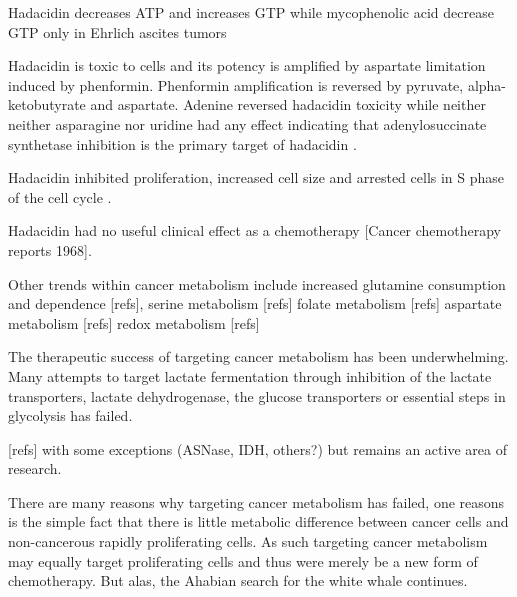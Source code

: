 Hadacidin decreases ATP and increases GTP while mycophenolic acid decrease GTP only in Ehrlich ascites tumors \cite{Barankiewicz2011-ak}

Hadacidin is toxic to cells and its potency is amplified by aspartate limitation induced by phenformin.
Phenformin amplification is reversed by pyruvate, alpha-ketobutyrate and aspartate.
Adenine reversed hadacidin toxicity while neither neither asparagine nor uridine had any effect indicating that adenylosuccinate synthetase inhibition is the primary target of hadacidin \cite{Neuman1963-dx}.

Hadacidin inhibited proliferation, increased cell size and arrested cells in S phase of the cell cycle \cite{Ladino1989-rj}.

Hadacidin had no useful clinical effect as a chemotherapy [Cancer chemotherapy reports 1968].




Other trends within cancer metabolism include increased glutamine consumption and dependence [refs],
serine metabolism [refs]
folate metabolism [refs]
aspartate metabolism [refs]
redox metabolism [refs]

The therapeutic success of targeting cancer metabolism has been underwhelming.
Many attempts to target lactate fermentation through inhibition of the lactate transporters, lactate dehydrogenase, the glucose transporters or essential steps in glycolysis has failed.

[refs] with some exceptions (ASNase, IDH, others?) but remains an active area of research.

There are many reasons why targeting cancer metabolism has failed, one reasons is the simple fact that there is little metabolic difference between cancer cells and non-cancerous rapidly proliferating cells.
As such targeting cancer metabolism may equally target proliferating cells and thus were merely be a new form of chemotherapy.
But alas, the Ahabian search for the white whale continues.






